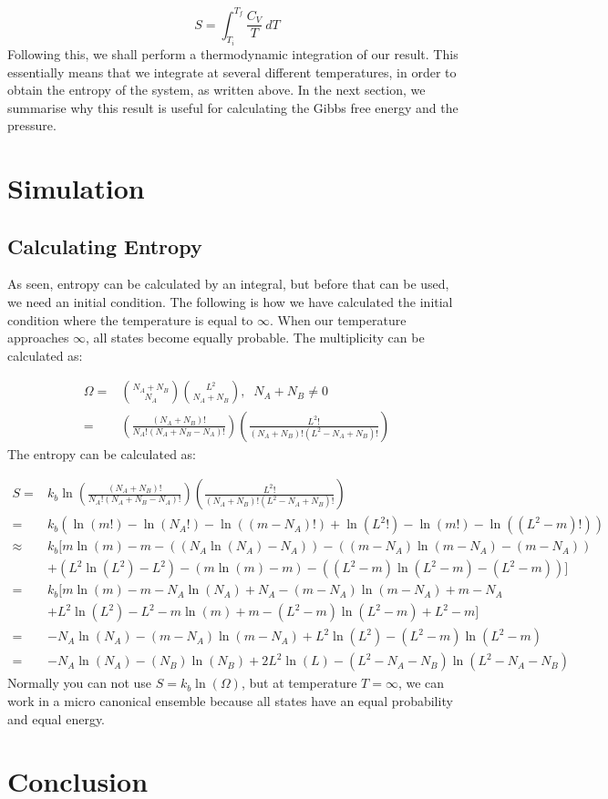 \documentclass[12pt,a4paper]{report}
\begin{document}
\begin{equation}
S = \int^{T_f}_{T_i} \frac{C_V}{T}\ dT
\end{equation}
Following this, we shall perform a thermodynamic integration of our result. This essentially means that we integrate at several different temperatures, in order to obtain the entropy of the system, as written above. In the next section, we summarise why this result is useful for calculating the Gibbs free energy and the pressure.






\chapter{Simulation}

\section{Calculating Entropy}
As seen, entropy can be calculated by an integral, but before that can be used, we need an initial condition. The following is how we have calculated the initial condition where the temperature is equal to $\infty$. When our temperature approaches $\infty$, all states become equally probable. The multiplicity can be calculated as:

\begin{align}
\Omega=&\binom{N_A+N_B}{N_A}\binom{L^2}{N_A+N_B}, \;\; N_A+N_B\neq 0\\
=&\left(\frac{(N_A+N_B)!}{N_A!(N_A+N_B-N_A)!}\right) \left(\frac{L^2!}{(N_A+N_B)!(L^2-N_A+N_B)!}\right)
\end{align}
The entropy can be calculated as:

\begin{align}
S =& k_b \ln \left( \frac{(N_A+N_B)!}{N_A!(N_A+N_B-N_A)!}\right) \left( \frac{L^2!}{(N_A+N_B)!(L^2-N_A+N_B)!}\right)\\
=& k_b \left( \ln(m!)-\ln(N_A!)-\ln((m-N_A)!)+\ln(L^2!)-\ln(m!)- \ln((L^2-m)!) \right)\\
\approx& k_b [ m\ln(m)-m -((N_A\ln(N_A)-N_A)) - ((m-N_A)\ln(m-N_A)-(m-N_A)) \\ 
& +(L^2 \ln(L^2)-L^2)-(m\ln(m)-m)-((L^2-m)\ln(L^2-m)-(L^2-m)) ] \\
=& k_b[	m\ln(m)-m - N_A\ln(N_A)+N_A-(m-N_A)\ln(m-N_A)+m-N_A \\
& +L^2\ln(L^2)-L^2 - m\ln(m)+m - (L^2-m)\ln(L^2-m)+L^2-m] \\
=& -N_A\ln(N_A)-(m-N_A)\ln(m-N_A)+L^2\ln(L^2)-(L^2-m)\ln(L^2-m)\\
=& -N_A\ln(N_A)-(N_B)\ln(N_B)+2L^2\ln(L)-(L^2-N_A-N_B)\ln(L^2-N_A-N_B)
\end{align}
Normally you can not use $S = k_b\ln(\Omega)$, but at temperature $T=\infty$, we can work in a micro canonical ensemble because all states have an equal probability and equal energy.  


\chapter{Conclusion}
\end{document}
